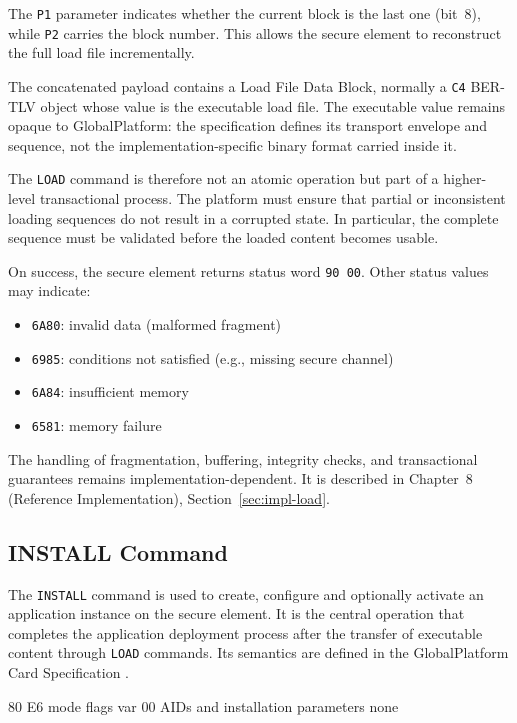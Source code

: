 The \texttt{P1} parameter indicates whether the current block is the last one
(bit~8), while \texttt{P2} carries the block number. This allows the secure
element to reconstruct the full load file incrementally.

The concatenated payload contains a Load File Data Block, normally a
\texttt{C4} BER-TLV object whose value is the executable load file. The
executable value remains opaque to GlobalPlatform: the specification defines
its transport envelope and sequence, not the implementation-specific binary
format carried inside it.

The \texttt{LOAD} command is therefore not an atomic operation but part of a
higher-level transactional process. The platform must ensure that partial or
inconsistent loading sequences do not result in a corrupted state. In
particular, the complete sequence must be validated before the loaded content
becomes usable.

On success, the secure element returns status word \texttt{90 00}. Other status values
may indicate:
\begin{itemize}
\item \texttt{6A80}: invalid data (malformed fragment)
\item \texttt{6985}: conditions not satisfied (e.g., missing secure channel)
\item \texttt{6A84}: insufficient memory
\item \texttt{6581}: memory failure
\end{itemize}

The handling of fragmentation, buffering, integrity checks, and
transactional guarantees remains implementation-dependent. It is
described in Chapter~8 (Reference Implementation),
Section~\ref{sec:impl-load}.

\subsection{INSTALL Command}
\label{sec:gp-install-command}

The \texttt{INSTALL} command is used to create, configure and optionally
activate an application instance on the secure element. It is the central
operation that completes the application deployment process after the transfer
of executable content through \texttt{LOAD} commands. Its semantics are defined
in the GlobalPlatform Card Specification .

\apdudesc
{80}
{E6}
{mode}
{flags}
{var}
{00}
{AIDs and installation parameters}
{none}

